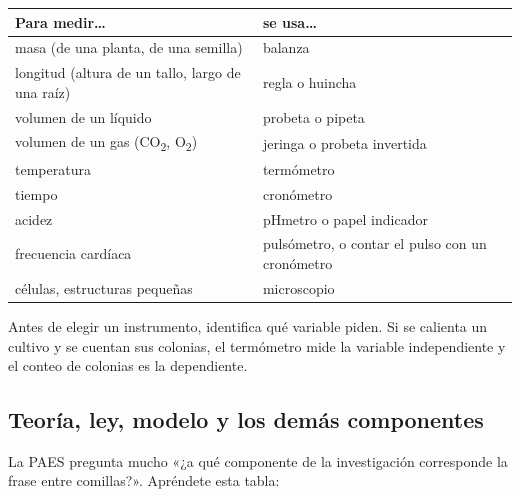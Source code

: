   
\begin{clave} \begin{center}\small
\begin{tabularx}{\linewidth}{@{}>{\raggedright\arraybackslash\hsize=1.00\hsize}X>{\raggedright\arraybackslash\hsize=1.00\hsize}X@{}}
\toprule
\textbf{Para medir\dots{}} & \textbf{se usa\dots{}} \\
\midrule
masa (de una planta, de una semilla) & balanza \\
longitud (altura de un tallo, largo de una raíz) & regla o huincha \\
volumen de un líquido & probeta o pipeta \\
volumen de un gas (CO\textsubscript{2}, O\textsubscript{2}) & jeringa o probeta invertida \\
temperatura & termómetro \\
tiempo & cronómetro \\
acidez & pHmetro o papel indicador \\
frecuencia cardíaca & pulsómetro, o contar el pulso con un cronómetro \\
células, estructuras pequeñas & microscopio \\
\bottomrule
\end{tabularx}
\end{center}\end{clave}
 
\begin{clave}[{Recuerda}] Antes de elegir un instrumento, identifica qué variable piden. Si se calienta un cultivo y se cuentan sus colonias, el termómetro mide la variable independiente y el conteo de colonias es la dependiente.\end{clave}
\subsection{Teoría, ley, modelo y los demás componentes}
La PAES pregunta mucho «¿a qué componente de la investigación corresponde la frase entre comillas?». Apréndete esta tabla:

